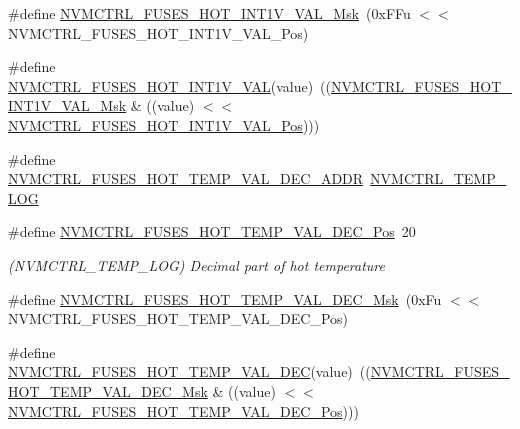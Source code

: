 \begin{DoxyCompactItemize}
\#define \mbox{\hyperlink{group__fuses__api_ga597db170df2ccec19aff4e7067f9e291}{N\+V\+M\+C\+T\+R\+L\+\_\+\+F\+U\+S\+E\+S\+\_\+\+H\+O\+T\+\_\+\+I\+N\+T1\+V\+\_\+\+V\+A\+L\+\_\+\+Msk}}~(0x\+F\+Fu $<$$<$ N\+V\+M\+C\+T\+R\+L\+\_\+\+F\+U\+S\+E\+S\+\_\+\+H\+O\+T\+\_\+\+I\+N\+T1\+V\+\_\+\+V\+A\+L\+\_\+\+Pos)
\item 
\#define \mbox{\hyperlink{group__fuses__api_ga3ee8ba9068f82ea8e788b499548e53dc}{N\+V\+M\+C\+T\+R\+L\+\_\+\+F\+U\+S\+E\+S\+\_\+\+H\+O\+T\+\_\+\+I\+N\+T1\+V\+\_\+\+V\+AL}}(value)~((\mbox{\hyperlink{group__fuses__api_ga597db170df2ccec19aff4e7067f9e291}{N\+V\+M\+C\+T\+R\+L\+\_\+\+F\+U\+S\+E\+S\+\_\+\+H\+O\+T\+\_\+\+I\+N\+T1\+V\+\_\+\+V\+A\+L\+\_\+\+Msk}} \& ((value) $<$$<$ \mbox{\hyperlink{group__fuses__api_gad1b7b3b85a3a761b154b59975f5de897}{N\+V\+M\+C\+T\+R\+L\+\_\+\+F\+U\+S\+E\+S\+\_\+\+H\+O\+T\+\_\+\+I\+N\+T1\+V\+\_\+\+V\+A\+L\+\_\+\+Pos}})))
\item 
\#define \mbox{\hyperlink{group__fuses__api_gacbbda60a858bcd87ac67eded99860f5e}{N\+V\+M\+C\+T\+R\+L\+\_\+\+F\+U\+S\+E\+S\+\_\+\+H\+O\+T\+\_\+\+T\+E\+M\+P\+\_\+\+V\+A\+L\+\_\+\+D\+E\+C\+\_\+\+A\+D\+DR}}~\mbox{\hyperlink{group___s_a_m_d21_j18_a__base_gae900d443ec6d7cf1c90d21b6662fa447}{N\+V\+M\+C\+T\+R\+L\+\_\+\+T\+E\+M\+P\+\_\+\+L\+OG}}
\item 
\#define \mbox{\hyperlink{group__fuses__api_ga5dd188f426f80a6ad1f51c4815482ae6}{N\+V\+M\+C\+T\+R\+L\+\_\+\+F\+U\+S\+E\+S\+\_\+\+H\+O\+T\+\_\+\+T\+E\+M\+P\+\_\+\+V\+A\+L\+\_\+\+D\+E\+C\+\_\+\+Pos}}~20
\begin{DoxyCompactList}\small\item\em (N\+V\+M\+C\+T\+R\+L\+\_\+\+T\+E\+M\+P\+\_\+\+L\+OG) Decimal part of hot temperature \end{DoxyCompactList}\item 
\#define \mbox{\hyperlink{group__fuses__api_ga9590f44c54507db098841324ba8162e5}{N\+V\+M\+C\+T\+R\+L\+\_\+\+F\+U\+S\+E\+S\+\_\+\+H\+O\+T\+\_\+\+T\+E\+M\+P\+\_\+\+V\+A\+L\+\_\+\+D\+E\+C\+\_\+\+Msk}}~(0x\+Fu $<$$<$ N\+V\+M\+C\+T\+R\+L\+\_\+\+F\+U\+S\+E\+S\+\_\+\+H\+O\+T\+\_\+\+T\+E\+M\+P\+\_\+\+V\+A\+L\+\_\+\+D\+E\+C\+\_\+\+Pos)
\item 
\#define \mbox{\hyperlink{group__fuses__api_ga117d4dfd8a1a03957376cddfae9ed5f3}{N\+V\+M\+C\+T\+R\+L\+\_\+\+F\+U\+S\+E\+S\+\_\+\+H\+O\+T\+\_\+\+T\+E\+M\+P\+\_\+\+V\+A\+L\+\_\+\+D\+EC}}(value)~((\mbox{\hyperlink{group__fuses__api_ga9590f44c54507db098841324ba8162e5}{N\+V\+M\+C\+T\+R\+L\+\_\+\+F\+U\+S\+E\+S\+\_\+\+H\+O\+T\+\_\+\+T\+E\+M\+P\+\_\+\+V\+A\+L\+\_\+\+D\+E\+C\+\_\+\+Msk}} \& ((value) $<$$<$ \mbox{\hyperlink{group__fuses__api_ga5dd188f426f80a6ad1f51c4815482ae6}{N\+V\+M\+C\+T\+R\+L\+\_\+\+F\+U\+S\+E\+S\+\_\+\+H\+O\+T\+\_\+\+T\+E\+M\+P\+\_\+\+V\+A\+L\+\_\+\+D\+E\+C\+\_\+\+Pos}})))

\end{DoxyCompactItemize}
